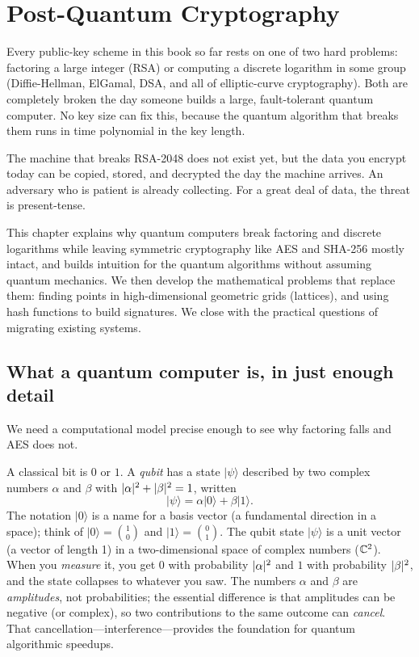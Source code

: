 \chapter{Post-Quantum Cryptography}

\providecommand{\ket}[1]{\lvert #1 \rangle}

Every public-key scheme in this book so far rests on one of two hard problems: factoring a large integer (RSA) or computing a discrete logarithm in some group (Diffie-Hellman, ElGamal, DSA, and all of elliptic-curve cryptography). Both are completely broken the day someone builds a large, fault-tolerant quantum computer. No key size can fix this, because the quantum algorithm that breaks them runs in time polynomial in the key length.

The machine that breaks RSA-2048 does not exist yet, but the data you encrypt today can be copied, stored, and decrypted the day the machine arrives. An adversary who is patient is already collecting. For a great deal of data, the threat is present-tense.

This chapter explains why quantum computers break factoring and discrete logarithms while leaving symmetric cryptography like AES and SHA-256 mostly intact, and builds intuition for the quantum algorithms without assuming quantum mechanics. We then develop the mathematical problems that replace them: finding points in high-dimensional geometric grids (lattices), and using hash functions to build signatures. We close with the practical questions of migrating existing systems.

\chapterline

\section{What a quantum computer is, in just enough detail}
\label{ch35:qc-model}

We need a computational model precise enough to see why factoring falls and AES does not.

A classical bit is $0$ or $1$. A \emph{qubit} has a state $\ket{\psi}$ described by two complex numbers $\alpha$ and $\beta$ with $\lvert\alpha\rvert^2 + \lvert\beta\rvert^2 = 1$, written
\[
  \ket{\psi} = \alpha\ket{0} + \beta\ket{1}.
\]
The notation $\ket{0}$ is a name for a basis vector (a fundamental direction in a space); think of $\ket{0}=\binom{1}{0}$ and $\ket{1}=\binom{0}{1}$. The qubit state $\ket{\psi}$ is a unit vector (a vector of length 1) in a two-dimensional space of complex numbers ($\mathbb{C}^2$). When you \emph{measure} it, you get $0$ with probability $\lvert\alpha\rvert^2$ and $1$ with probability $\lvert\beta\rvert^2$, and the state collapses to whatever you saw. The numbers $\alpha$ and $\beta$ are \emph{amplitudes}, not probabilities; the essential difference is that amplitudes can be negative (or complex), so two contributions to the same outcome can \emph{cancel}. That cancellation---interference---provides the foundation for quantum algorithmic speedups.

